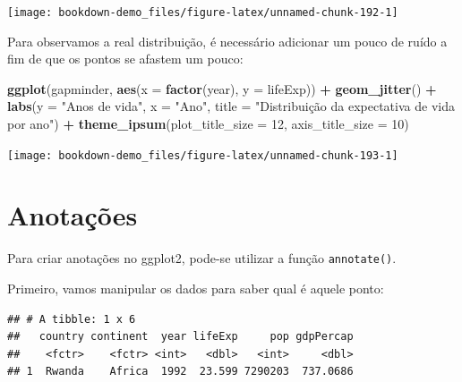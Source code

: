 \documentclass[]{book}
\newenvironment{Shaded}{\begin{snugshade}}{\end{snugshade}}
\newcommand{\KeywordTok}[1]{\textcolor[rgb]{0.13,0.29,0.53}{\textbf{#1}}}
\newcommand{\DataTypeTok}[1]{\textcolor[rgb]{0.13,0.29,0.53}{#1}}
\newcommand{\DecValTok}[1]{\textcolor[rgb]{0.00,0.00,0.81}{#1}}
\newcommand{\StringTok}[1]{\textcolor[rgb]{0.31,0.60,0.02}{#1}}
\newcommand{\OperatorTok}[1]{\textcolor[rgb]{0.81,0.36,0.00}{\textbf{#1}}}
\newcommand{\NormalTok}[1]{#1}
\begin{document}
\begin{center}\texttt{[image: bookdown-demo\_files/figure-latex/unnamed-chunk-192-1]} \end{center}

Para observamos a real distribuição, é necessário adicionar um pouco de
ruído a fim de que os pontos se afastem um pouco:

\begin{Shaded}
\begin{Highlighting}[]
\KeywordTok{ggplot}\NormalTok{(gapminder, }\KeywordTok{aes}\NormalTok{(}\DataTypeTok{x =} \KeywordTok{factor}\NormalTok{(year), }\DataTypeTok{y =}\NormalTok{ lifeExp)) }\OperatorTok{+}
\StringTok{  }\KeywordTok{geom_jitter}\NormalTok{() }\OperatorTok{+}
\StringTok{  }\KeywordTok{labs}\NormalTok{(}\DataTypeTok{y =} \StringTok{"Anos de vida"}\NormalTok{,}
       \DataTypeTok{x =} \StringTok{"Ano"}\NormalTok{,}
       \DataTypeTok{title =} \StringTok{"Distribuição da expectativa de vida por ano"}\NormalTok{) }\OperatorTok{+}
\StringTok{  }\KeywordTok{theme_ipsum}\NormalTok{(}\DataTypeTok{plot_title_size =} \DecValTok{12}\NormalTok{,      }
              \DataTypeTok{axis_title_size =} \DecValTok{10}\NormalTok{) }
\end{Highlighting}
\end{Shaded}

\begin{center}\texttt{[image: bookdown-demo\_files/figure-latex/unnamed-chunk-193-1]} \end{center}

\section{Anotações}\label{anotacoes}

Para criar anotações no ggplot2, pode-se utilizar a função
\texttt{annotate()}.

Primeiro, vamos manipular os dados para saber qual é aquele ponto:

\begin{Shaded}
\end{Shaded}

\begin{verbatim}
## # A tibble: 1 x 6
##   country continent  year lifeExp     pop gdpPercap
##    <fctr>    <fctr> <int>   <dbl>   <int>     <dbl>
## 1  Rwanda    Africa  1992  23.599 7290203  737.0686
\end{verbatim}
\end{document}
